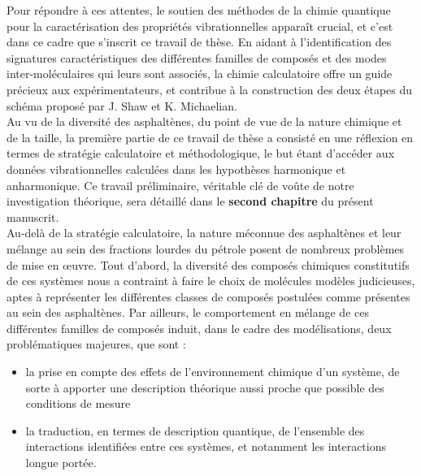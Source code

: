 	Pour répondre à ces attentes, le soutien des méthodes de la chimie quantique pour la caractérisation des propriétés vibrationnelles apparaît crucial, et c'est dans ce cadre que s'inscrit ce travail de thèse. En aidant à l'identification des signatures caractéristiques des différentes familles de composés et des modes inter-moléculaires qui leurs sont associés, la chimie calculatoire offre un guide précieux aux expérimentateurs, et contribue à la construction des deux étapes du schéma proposé par J. Shaw et K. Michaelian.\\
	
	Au vu de la diversité des asphaltènes, du point de vue de la nature chimique et de la taille, la première partie de ce travail de thèse a consisté en une réflexion en termes de stratégie calculatoire et méthodologique, le but étant d'accéder aux données vibrationnelles calculées dans les hypothèses harmonique et anharmonique. Ce travail préliminaire, véritable clé de voûte de notre investigation théorique, sera détaillé dans le \textbf{second chapitre} du présent manuscrit.\\
	
	Au-delà de la stratégie calculatoire, la nature méconnue des asphaltènes et leur mélange au sein des fractions lourdes du pétrole posent de nombreux problèmes de mise en œuvre. 
	Tout d'abord, la diversité des composés chimiques constitutifs de ces systèmes nous a contraint à faire le choix de molécules modèles judicieuses, aptes à représenter les différentes classes de composés postulées comme présentes au sein des asphaltènes. 
	Par ailleurs, le comportement en mélange de ces différentes familles de composés induit, dans le cadre des modélisations, deux problématiques majeures, que sont : 
	\begin{itemize}
	\item la prise en compte des effets de l'environnement chimique d'un système, de sorte à apporter une description théorique aussi proche que possible des conditions de mesure
	\item la traduction, en termes de description quantique, de l'ensemble des interactions identifiées entre ces systèmes, et notamment les interactions longue portée.
	\end{itemize}
	
